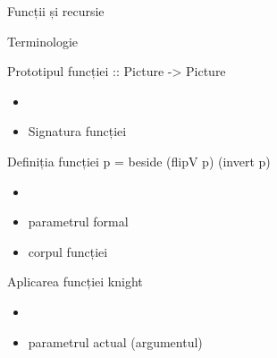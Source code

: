 \documentclass[handout,xcolor=pdftex,romanian,colorlinks]{beamer}
\begin{document}
\begin{section}{Funcții și recursie}
\begin{frame}{Terminologie}
\begin{block}{Prototipul funcției \hfill
{} {\color{black}:: Picture -> Picture}}
\begin{itemize}
\item {}
\item Signatura funcției
\end{itemize}
\end{block}
\begin{block}{Definiția funcției \hfill {} \alert{p} {\color{black}= beside (flipV p) (invert p)}}

\begin{itemize}
\item {}
\item \alert{parametrul formal}
\item corpul funcției
\end{itemize}
\end{block}
\begin{block}{Aplicarea funcției \hfill {} \alert{knight}}
\begin{itemize}
\item {}
\item \alert{parametrul actual (argumentul)}
\end{itemize}
\end{block}
\end{frame}
\end{section}
\end{document}
